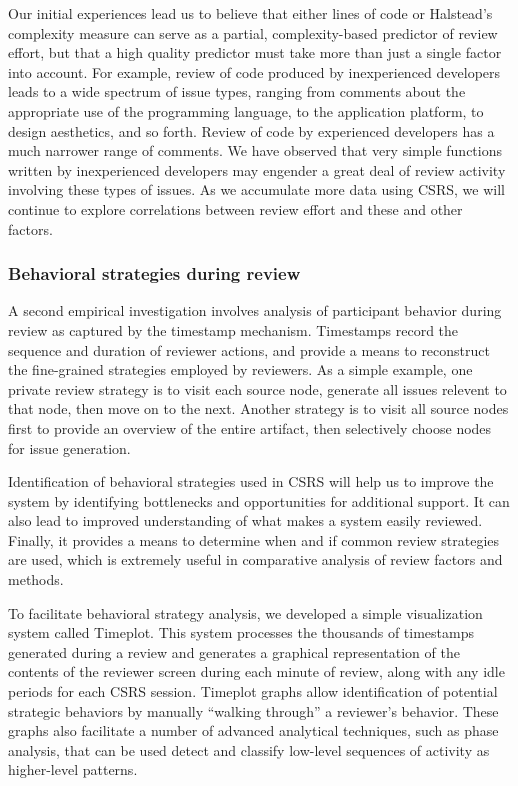 Our initial experiences lead us to believe that either lines of code or
Halstead's complexity measure can serve as a partial, complexity-based
predictor of review effort, but that a high quality predictor must take
more than just a single factor into account.  For example, review of code
produced by inexperienced developers leads to a wide spectrum of issue
types, ranging from comments about the appropriate use of the programming
language, to the application platform, to design aesthetics, and so forth.
Review of code by experienced developers has a much narrower range of
comments.  We have observed that very simple functions written by
inexperienced developers may engender a great deal of review activity
involving these types of issues.  As we accumulate more data using CSRS, we
will continue to explore correlations between review effort and these and
other factors.


\subsubsection{Behavioral strategies during review}

A second empirical investigation involves analysis of participant behavior
during review as captured by the timestamp mechanism.  Timestamps record
the sequence and duration of reviewer actions, and provide a means to
reconstruct the fine-grained strategies employed by reviewers.  As a simple
example, one private review strategy is to visit each source node, generate
all issues relevent to that node, then move on to the next.  Another
strategy is to visit all source nodes first to provide an overview of the
entire artifact, then selectively choose nodes for issue generation.  

Identification of behavioral strategies used in CSRS will help us to
improve the system by identifying bottlenecks and opportunities for
additional support. It can also lead to improved understanding of what
makes a system easily reviewed.  Finally, it provides a means to determine
when and if common review strategies are used, which is extremely useful in
comparative analysis of review factors and methods.

To facilitate behavioral strategy analysis, we developed a simple
visualization system called Timeplot. This system processes the thousands
of timestamps generated during a review and generates a graphical
representation of the contents of the reviewer screen during each minute of
review, along with any idle periods for each CSRS session.  Timeplot graphs
allow identification of potential strategic behaviors by manually ``walking
through'' a reviewer's behavior.  These graphs also facilitate a number of
advanced analytical techniques, such as phase analysis, that can be used
detect and classify low-level sequences of activity as higher-level
patterns.

